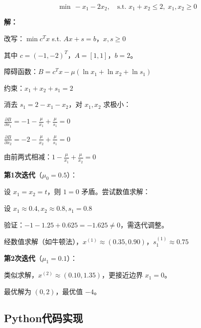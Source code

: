 \begin{example}
\[
\min \, -x_1 - 2x_2, \quad \text{s.t. } x_1 + x_2 \leq 2, \; x_1, x_2 \geq 0
\]

\textbf{解：}

改写：$\min c^T x$ s.t. $Ax + s = b$，$x, s \geq 0$

其中 $c = (-1, -2)^T$，$A = [1, 1]$，$b = 2$。

障碍函数：$B = c^T x - \mu(\ln x_1 + \ln x_2 + \ln s_1)$

约束：$x_1 + x_2 + s_1 = 2$

消去 $s_1 = 2 - x_1 - x_2$，对 $x_1, x_2$ 求极小：

$\frac{\partial B}{\partial x_1} = -1 - \frac{\mu}{x_1} + \frac{\mu}{s_1} = 0$

$\frac{\partial B}{\partial x_2} = -2 - \frac{\mu}{x_2} + \frac{\mu}{s_1} = 0$

由前两式相减：$1 - \frac{\mu}{x_1} + \frac{\mu}{x_2} = 0$

\textbf{第1次迭代}（$\mu_0 = 0.5$）：

设 $x_1 = x_2 = t$，则 $1 = 0$ 矛盾。尝试数值求解：

设 $x_1 \approx 0.4, x_2 \approx 0.8, s_1 = 0.8$

验证：$-1 - 1.25 + 0.625 = -1.625 \neq 0$，需迭代调整。

经数值求解（如牛顿法），$x^{(1)} \approx (0.35, 0.90)$，$s_1^{(1)} \approx 0.75$

\textbf{第2次迭代}（$\mu_1 = 0.1$）：

类似求解，$x^{(2)} \approx (0.10, 1.35)$，更接近边界 $x_1 = 0$。

最优解为 $(0, 2)$，最优值 $-4$。
\end{example}

\subsection{Python代码实现}\label{sec:interior-code}


